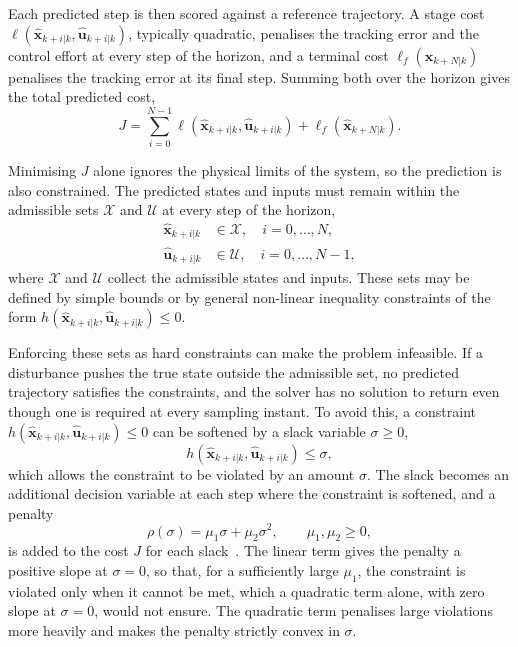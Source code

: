 Each predicted step is then scored against a reference trajectory. A stage cost $\ell(\hat{\mathbf{x}}_{k+i|k}, \hat{\mathbf{u}}_{k+i|k})$, typically quadratic, penalises the tracking error and the control effort at every step of the horizon, and a terminal cost $\ell_f(\hat{\mathbf{x}}_{k+N|k})$ penalises the tracking error at its final step. Summing both over the horizon gives the total predicted cost,
\begin{equation}
    J = \sum_{i=0}^{N-1} \ell\left( \hat{\mathbf{x}}_{k+i|k}, \hat{\mathbf{u}}_{k+i|k} \right) + \ell_f\left( \hat{\mathbf{x}}_{k+N|k} \right).
    \label{eq:nmpc_cost}
\end{equation}

Minimising $J$ alone ignores the physical limits of the system, so the prediction is also constrained. The predicted states and inputs must remain within the admissible sets $\mathcal{X}$ and $\mathcal{U}$ at every step of the horizon,
\begin{align}
    \hat{\mathbf{x}}_{k+i|k} &\in \mathcal{X}, \quad i = 0, \dots, N, \label{eq:nmpc_bounds_x} \\
    \hat{\mathbf{u}}_{k+i|k} &\in \mathcal{U}, \quad i = 0, \dots, N-1, \label{eq:nmpc_bounds_u}
\end{align}
where $\mathcal{X}$ and $\mathcal{U}$ collect the admissible states and inputs. These sets may be defined by simple bounds or by general non-linear inequality constraints of the form $h(\hat{\mathbf{x}}_{k+i|k}, \hat{\mathbf{u}}_{k+i|k}) \le 0$.

Enforcing these sets as hard constraints can make the problem infeasible. If a disturbance pushes the true state outside the admissible set, no predicted trajectory satisfies the constraints, and the solver has no solution to return even though one is required at every sampling instant. To avoid this, a constraint $h(\hat{\mathbf{x}}_{k+i|k}, \hat{\mathbf{u}}_{k+i|k}) \le 0$ can be softened by a slack variable $\sigma \ge 0$,
\begin{equation}
    h(\hat{\mathbf{x}}_{k+i|k}, \hat{\mathbf{u}}_{k+i|k}) \le \sigma,
    \label{eq:nmpc_soft_constraint}
\end{equation}
which allows the constraint to be violated by an amount $\sigma$. The slack becomes an additional decision variable at each step where the constraint is softened, and a penalty
\begin{equation}
    \rho(\sigma) = \mu_{1}\sigma + \mu_{2}\sigma^2, \qquad \mu_{1}, \mu_{2} \ge 0,
    \label{eq:nmpc_slack_penalty}
\end{equation}
is added to the cost $J$ for each slack~\cite{kerriganSoftConstraintsExact2000}. The linear term gives the penalty a positive slope at $\sigma = 0$, so that, for a sufficiently large $\mu_1$, the constraint is violated only when it cannot be met, which a quadratic term alone, with zero slope at $\sigma = 0$, would not ensure. The quadratic term penalises large violations more heavily and makes the penalty strictly convex in $\sigma$.

